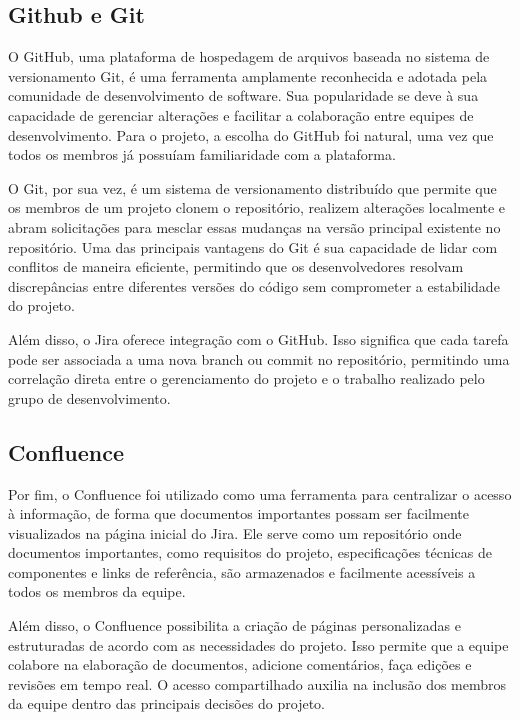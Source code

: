     \subsection{Github e Git}

    O GitHub, uma plataforma de hospedagem de arquivos baseada no sistema de versionamento Git, é uma ferramenta amplamente reconhecida e adotada pela comunidade de desenvolvimento de software. Sua popularidade se deve à sua capacidade de gerenciar alterações e facilitar a colaboração entre equipes de desenvolvimento. Para o projeto, a escolha do GitHub foi natural, uma vez que todos os membros já possuíam familiaridade com a plataforma.
    
    O Git, por sua vez, é um sistema de versionamento distribuído que permite que os membros de um projeto clonem o repositório, realizem alterações localmente e abram solicitações para mesclar essas mudanças na versão principal existente no repositório. Uma das principais vantagens do Git é sua capacidade de lidar com conflitos de maneira eficiente, permitindo que os desenvolvedores resolvam discrepâncias entre diferentes versões do código sem comprometer a estabilidade do projeto.
    
    Além disso, o Jira oferece integração com o GitHub. Isso significa que cada tarefa pode ser associada a uma nova branch ou commit no repositório, permitindo uma correlação direta entre o gerenciamento do projeto e o trabalho realizado pelo grupo de desenvolvimento.

    \subsection{Confluence}
    Por fim, o Confluence foi utilizado como uma ferramenta para centralizar o acesso à informação, de forma que documentos importantes possam ser facilmente visualizados na página inicial do Jira. Ele serve como um repositório onde documentos importantes, como requisitos do projeto, especificações técnicas de componentes e links de referência, são armazenados e facilmente acessíveis a todos os membros da equipe.
    
    Além disso, o Confluence possibilita a criação de páginas personalizadas e estruturadas de acordo com as necessidades do projeto. Isso permite que a equipe colabore na elaboração de documentos, adicione comentários, faça edições e revisões em tempo real. O acesso compartilhado auxilia na inclusão dos membros da equipe dentro das principais decisões do projeto.

